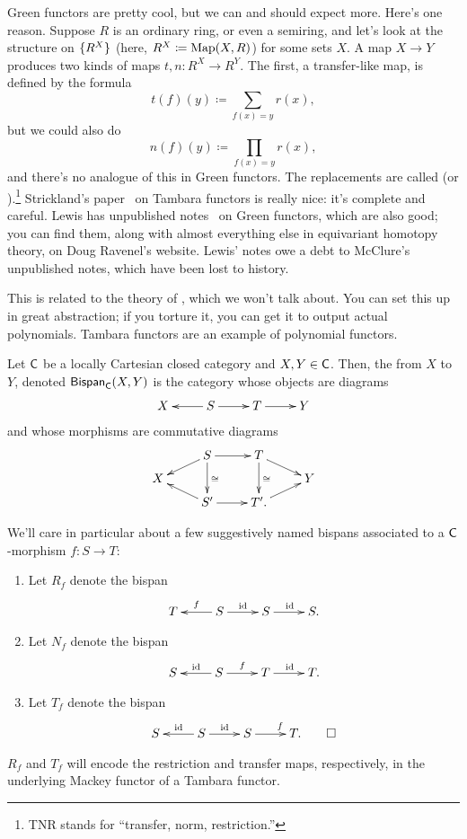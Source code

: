 Green functors are pretty cool, but we can and should expect more. Here's one reason. Suppose $R$ is an ordinary
ring, or even a semiring, and let's look at the structure on $\{R^X\}$ (here, $R^X\coloneqq \operatorname{Map}(X,R)$) for some
sets $X$. A map $X\to Y$ produces two kinds of maps $t, n\colon R^X\to R^Y$. The first, a transfer-like map, is
defined by the formula
\[t(f)(y)\coloneqq \sum_{f(x) = y} r(x),\]
but we could also do
\[n(f)(y)\coloneqq \prod_{f(x) = y} r(x),\]
and there's no analogue of this in Green functors. The replacements are called  (or
).\footnote{TNR stands for ``transfer, norm, restriction.''} Strickland's
paper~\cite{StricklandTambara} on Tambara functors is really nice: it's complete and careful. Lewis has unpublished
notes~\cite{LewisGreen} on Green functors, which are also good; you can find them, along with almost everything
else in equivariant homotopy theory, on Doug Ravenel's website. Lewis' notes owe a debt to McClure's unpublished
notes, which have been lost to history.
\begin{rem}
This is related to the theory of , which we won't talk about. You can set this up in
great abstraction; if you torture it, you can get it to output actual polynomials. Tambara functors are an example
of polynomial functors.
\end{rem}
\begin{defn}
Let $\mathsf C$ be a locally Cartesian closed category and $X,Y\in\mathsf C$. Then, the  from $X$ to
$Y$, denoted $\mathsf{Bispan}_\mathsf C(X,Y)$ is the category whose objects are diagrams
\[\xymatrix{
	X & S\ar[l]\ar[r] & T\ar[r] & Y
}\]
and whose morphisms are commutative diagrams
\[\xymatrix@R=0.2cm{
	& S\ar[r]\ar[dl]\ar[dd]^\cong & T\ar[dd]^\cong\ar[dr]\\
	X &&& Y\\
	& S'\ar[r]\ar[ul] & T'.\ar[ur]
}\]
\end{defn}
\begin{exm}
We'll care in particular about a few suggestively named bispans associated to a $\mathsf C$-morphism $f\colon S\to T$:
\begin{enumerate}
	\item Let $R_f$ denote the bispan
	\[\xymatrix{
		T & S\ar[l]_f\ar[r]^\id & S\ar[r]^\id & S.
	}\]
	\item Let $N_f$ denote the bispan
	\[\xymatrix{
		S & S\ar[l]_\id\ar[r]^f & T\ar[r]^\id & T.
	}\]
	\item Let $T_f$ denote the bispan
	\[\xymatrix{
		S & S\ar[l]_\id\ar[r]^\id & S\ar[r]^f & T.\qedhere
	}\]
\end{enumerate}
\end{exm}
$R_f$ and $T_f$ will encode the restriction and transfer maps, respectively, in the underlying Mackey functor of a
Tambara functor.

